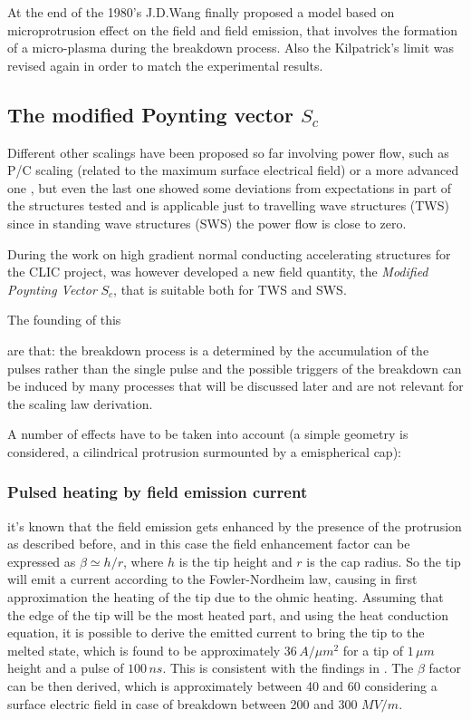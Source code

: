 At the end of the 1980's J.D.Wang finally proposed a model based on microprotrusion effect on the field and field emission, that involves the formation of a micro-plasma during the breakdown process. Also the Kilpatrick's limit was revised again in order to match the experimental results. \cite{Wang:1986, kilp:story}






\subsection{The modified Poynting vector $S_c$}

Different other scalings have been proposed so far involving power flow, such as P/C scaling (related to the maximum surface electrical field) or a more advanced one  \cite{Wuensch:1004189}, but even the last one showed some deviations from expectations in part of the structures tested and is applicable just to travelling wave structures (TWS) since in standing wave structures (SWS) the power flow is close to zero.

During the work on high gradient normal conducting accelerating structures for the CLIC project, was however developed a new field quantity, the \textit{Modified Poynting Vector} $S_c$, that is suitable both for TWS and SWS. \cite{Grudiev:newLoc}

The founding of this %

are that: the breakdown process is a determined by the accumulation of the pulses rather than the single pulse and the possible triggers of the breakdown can be induced by many processes that will be discussed later and are not relevant for the scaling law derivation.

A number of effects have to be taken into account (a simple geometry is considered, a cilindrical protrusion surmounted by a emispherical cap): 

\subsubsection{Pulsed heating by field emission current}

it's known that the field emission gets enhanced by the presence of the protrusion as described before, and in this case the field enhancement factor can be expressed as $\beta \simeq h/r$, where $h$ is the tip height and $r$ is the cap radius. So the tip will emit a current according to the Fowler-Nordheim law, causing in first approximation the heating of the tip due to the ohmic heating. Assuming that the edge of the tip will be the most heated part, and using the heat conduction equation, it is possible to derive the emitted current to bring the tip to the melted state, which is found to be approximately $36\, A/\mu m^2$ for a tip of $1 \, \mu m$ height and a pulse of $100\, ns$. This is consistent with the findings in \cite{soviet:1983}. The $\beta$ factor can be then derived, which is approximately between 40 and 60 considering a surface electric field in case of breakdown between 200 and 300 $MV/m$.


